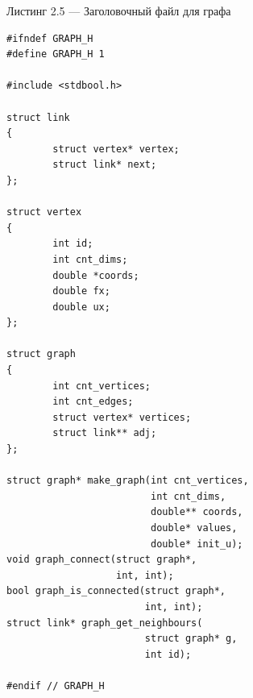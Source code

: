 \vspace{1em}
Листинг 2.5 --- Заголовочный файл для графа
\normalsize
\begin{verbatim}
#ifndef GRAPH_H
#define GRAPH_H 1

#include <stdbool.h>

struct link
{
        struct vertex* vertex;
        struct link* next;
};

struct vertex
{
        int id;
        int cnt_dims;
        double *coords;
        double fx;
        double ux;
};

struct graph
{
        int cnt_vertices;
        int cnt_edges;
        struct vertex* vertices;
        struct link** adj;
};

struct graph* make_graph(int cnt_vertices, 
                         int cnt_dims,
                         double** coords, 
                         double* values,
                         double* init_u);
void graph_connect(struct graph*, 
                   int, int);
bool graph_is_connected(struct graph*, 
                        int, int);
struct link* graph_get_neighbours(
                        struct graph* g, 
                        int id);

#endif // GRAPH_H

\end{verbatim}
\large


